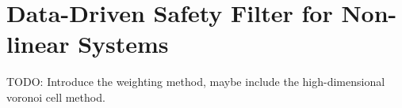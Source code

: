 \chapter{Data-Driven Safety Filter for Non-linear Systems}\label{chap:non-linear-system}
TODO: Introduce the weighting method, maybe include the high-dimensional voronoi cell method.